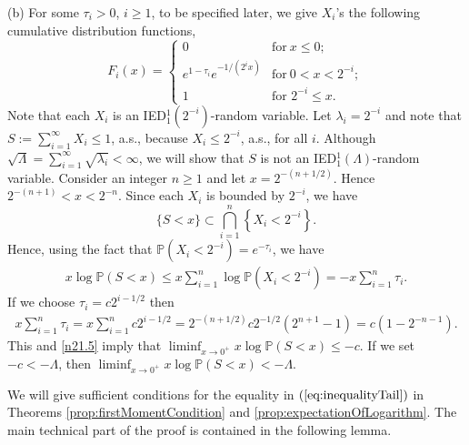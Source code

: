 \documentclass[bj]{imsart}
\numberwithin{equation}{section}
\renewcommand{\P}{\mathbb{P}}
\newcommand{\IGFT}{{\rm IED}}
\newcommand{\1}{\mathbf{1}}
\theoremstyle{definition}
\begin{document}
{(b) 
For some $\tau_i>0$, $i\geq 1$, to be specified later, we give
 $X_i$'s the following cumulative distribution functions, 
\begin{equation*}
 F_i(x)= \left\{ \begin{array}{cl}
          0& \textrm{for} \ x\leq 0;\\
                 e^{1-\tau_i}e^{-1/(2^i x)}&\textrm{for} \ 0<x<2^{-i};\\
           1& \textrm{for  } 2^{-i}\leq x.
                                      \end{array}
 \right.
\end{equation*}
Note that each $X_i$ is an \IGFT$^1_1(2^{-i})$-random variable.
Let $\lambda_i = 2^{-i}$ and note that $S:=\sum_{i=1}^{\infty}X_i\leq 1$, a.s., because   $X_i\leq 2^{-i}$, a.s., for all $i$.
Although $\sqrt{\Lambda}=\sum_{i=1}^{\infty}\sqrt{\lambda_i}<\infty$, we will show that
$S$ 
is not an \IGFT$^1_1(\Lambda)$-random variable. Consider an integer $n\geq 1$ and let $x=2^{-(n+1/2)}$.
Hence $2^{-(n+1)}<x<2^{-n}$. Since each $X_i$ is bounded by $2^{-i}$, we have 
$$\{S<x\}\subset \bigcap_{i=1}^{n}\left\{X_i<2^{-i}\right\}.$$ Hence, using the fact that $\P(X_i<2^{-i})=e^{-\tau_i}$, 
 we have
\begin{align}\label{n21.5}
x\log \P(S<x)\leq x \sum_{i=1}^{n}\log \P(X_i<2^{-i})= -x\sum_{i=1}^{n}\tau_i.
\end{align}
 If we choose $\tau_i =c2^{i-1/2}$
then
\begin{align*}
x\sum_{i=1}^{n}\tau_i = x\sum_{i=1}^{n} c2^{i-1/2}
=   2^{-(n+1/2)} c 2^{-1/2} (2^{n+1} -1) = c (1-2^{-n-1}) . 
\end{align*}
This and \eqref{n21.5} imply that
$\liminf_{x\to 0^+}x\log \P(S<x)\leq  -c$. If we set $-c< -\Lambda$, then $\liminf_{x\to 0^+}x\log \P(S<x)<  -\Lambda$.
} 

\bigskip

We will  give sufficient conditions for the equality in 
$(\ref{eq:inequalityTail})$ in Theorems \ref{prop:firstMomentCondition} and  \ref{prop:expectationOfLogarithm}. The main technical part of the proof is contained in the following lemma.
\end{document}
